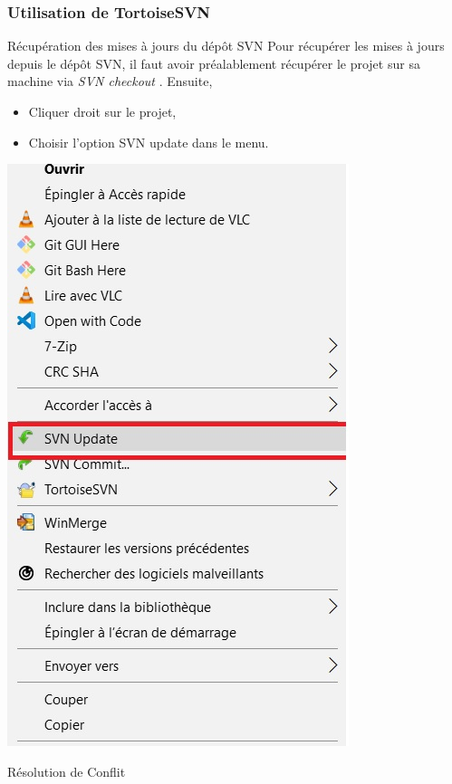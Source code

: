 \documentclass{beamer}
\begin{document}
\begin{frame}
\frametitle{Utilisation de TortoiseSVN}
\begin{block}{Récupération des mises à jours du dépôt SVN }
Pour récupérer les mises à jours depuis le dépôt SVN, il faut avoir préalablement récupérer le projet sur sa machine via \alert{\textit{SVN checkout}} . Ensuite,
\begin{itemize}
\item Cliquer droit sur le projet,
\item Choisir l'option SVN update dans le menu.
\end{itemize} 
\end{block}
\includegraphics[scale=0.3]{../images/update1.jpg}
\end{frame}


\begin{frame}
\begin{center}
\huge{Résolution de Conflit}
\end{center}
\end{frame}
\end{document}
